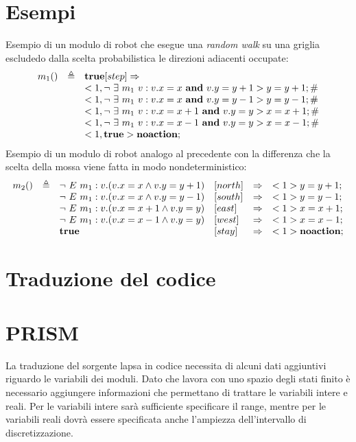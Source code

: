 \section{Esempi}
Esempio di un modulo di robot che esegue una \emph{random walk} su una griglia escludedo dalla scelta probabilistica le direzioni adiacenti occupate:
$$
\begin{array}{rcl}
m_1 () & \triangleq & \mathbf{true} [step]\Rightarrow \\ 
	& & <1, \neg \mbox{ } \exists \mbox{ } m_1 \mbox{ } v: v.x=x \mbox{ } \mathbf{and} \mbox{ } v.y=y+1> y=y+1; \# \\
	& & <1, \neg \mbox{ } \exists \mbox{ } m_1 \mbox{ } v: v.x=x \mbox{ } \mathbf{and} \mbox{ } v.y=y-1> y=y-1; \# \\ 
	& & <1, \neg \mbox{ } \exists \mbox{ } m_1 \mbox{ } v: v.x=x+1 \mbox{ } \mathbf{and} \mbox{ } v.y=y> x=x+1; \# \\ 
	& & <1, \neg \mbox{ } \exists \mbox{ } m_1 \mbox{ } v: v.x=x-1 \mbox{ } \mathbf{and} \mbox{ } v.y=y> x=x-1; \# \\ 
	& & <1, \mathbf{true}> \mathbf{noaction};\\ 
\end{array}
$$
Esempio di un modulo di robot analogo al precedente con la differenza che la scelta della mossa viene fatta in modo nondeterministico:
$$
\begin{array}{rcllcl}
m_2 () & \triangleq & \neg \mbox{ } E \mbox{ } m_1 : v . (v.x=x \wedge v.y=y+1) &[north]&\Rightarrow& <1> y=y+1; \\ 
	& & \neg \mbox{ } E \mbox{ } m_1 : v . (v.x=x \wedge v.y=y-1) &[south]&\Rightarrow& <1> y=y-1; \\ 
	& & \neg \mbox{ } E \mbox{ } m_1 : v . (v.x=x+1 \wedge v.y=y) &[east]&\Rightarrow& <1> x=x+1; \\ 
	& & \neg \mbox{ } E \mbox{ } m_1 : v . (v.x=x-1 \wedge v.y=y) &[west]&\Rightarrow& <1> x=x-1; \\ 
	& & \mathbf{true} &[stay]&\Rightarrow& <1> \mathbf{noaction}; \\ 
\end{array}
$$

\section{Traduzione del codice}
\section{PRISM}
La traduzione del sorgente \ac{lapsa} in codice \prism{} necessita di alcuni dati aggiuntivi riguardo le variabili dei moduli. Dato che \prism{} lavora con uno spazio degli stati finito è necessario aggiungere informazioni che permettano di trattare le variabili intere e reali. Per le variabili intere sarà sufficiente specificare il range, mentre per le variabili reali dovrà essere specificata anche l'ampiezza dell'intervallo di discretizzazione.

